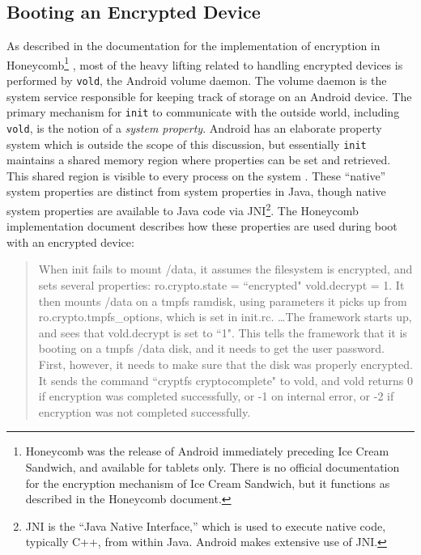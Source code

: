 \subsection{Booting an Encrypted Device} \label{ssec:encryptionboot}

As described in the documentation for the implementation of encryption in Honeycomb\footnote{Honeycomb was the release of Android
immediately preceding Ice Cream Sandwich, and available for tablets only. There is no official documentation for the encryption
mechanism of Ice Cream Sandwich, but it functions as described in the Honeycomb document.} \cite{honeycombcrypt}, most of the heavy
lifting related to handling encrypted devices is performed by \texttt{vold}, the Android volume daemon. The volume daemon is the
system service responsible for keeping track of storage on an Android device. The primary mechanism for \texttt{init} to communicate
with the outside world, including \texttt{vold}, is the notion of a \emph{system property}.  Android has an elaborate property system
which is outside the scope of this discussion, but essentially \texttt{init} maintains a shared memory region where properties can
be set and retrieved. This shared region is visible to every process on the system \cite{propertysystem}. These ``native'' system
properties are distinct from system properties in Java, though native system properties are available to Java code via
JNI\footnote{JNI is the ``Java Native Interface,'' which is used to execute native code, typically C++, from within Java. Android
makes extensive use of JNI.}. The Honeycomb implementation document describes how these properties are used during boot with an
encrypted device:

\begin{quote} When init fails to mount /data, it assumes the filesystem is encrypted, and sets several properties: ro.crypto.state =
``encrypted" vold.decrypt = 1. It then mounts /data on a tmpfs ramdisk, using parameters it picks up from ro.crypto.tmpfs\_options,
which is set in init.rc.  \ldots The framework starts up, and sees that vold.decrypt is set to ``1". This tells the framework that it
is booting on a tmpfs /data disk, and it needs to get the user password. First, however, it needs to make sure that the disk was
properly encrypted. It sends the command ``cryptfs cryptocomplete" to vold, and vold returns 0 if encryption was completed
successfully, or -1 on internal error, or -2 if encryption was not completed successfully. \cite{honeycombcrypt}
\end{quote}

